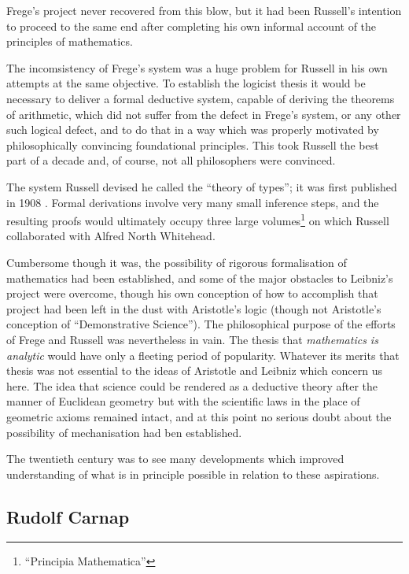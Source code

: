Frege's project never recovered from this blow, but it had been Russell's intention to proceed to the same end after completing his own informal account of the principles of mathematics. \cite{russellPRM}

The incomsistency of Frege's system was a huge problem for Russell in his own attempts at the same objective.
To establish the logicist thesis it would be necessary to deliver a formal deductive system, capable of deriving the theorems of arithmetic, which did not suffer from the defect in Frege's system, or any other such logical defect, and to do that in a way which was properly motivated by philosophically convincing foundational principles.
This took Russell the best part of a decade and, of course, not all philosophers were convinced.

The system Russell devised he called the ``theory of types''; it was first published in 1908 \cite{russell08}.
Formal derivations involve very many small inference steps, and the resulting proofs would ultimately occupy three large volumes\footnote{``Principia Mathematica''\cite{russell1913}} on which Russell collaborated with Alfred North Whitehead.

Cumbersome though it was, the possibility of rigorous formalisation of mathematics had been established, and some of the major obstacles to Leibniz's project were overcome, though his own conception of how to accomplish that project had been left in the dust with Aristotle's logic (though not Aristotle's conception of ``Demonstrative Science'').
The philosophical purpose of the efforts of Frege and Russell was nevertheless in vain.
The thesis that \emph{mathematics is analytic} would have only a fleeting period of popularity.
Whatever its merits that thesis was not essential to the ideas of Aristotle and Leibniz which concern us here.
The idea that science could be rendered as a deductive theory after the manner of Euclidean geometry but with the scientific laws in the place of geometric axioms remained intact, and at this point no serious doubt about the possibility of mechanisation had ben established.

The twentieth century was to see many developments which improved understanding of what is in principle possible in relation to these aspirations.

\subsection{Rudolf Carnap}

